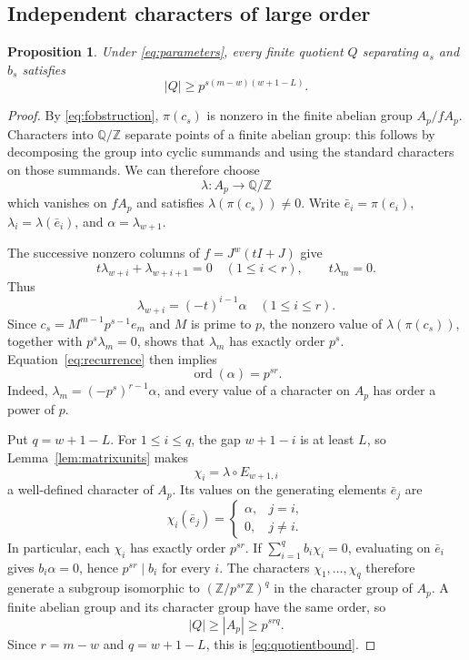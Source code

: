 \documentclass[11pt,letterpaper]{amsart}
\numberwithin{equation}{section}
\newtheorem{proposition}[theorem]{Proposition}
\theoremstyle{remark}
\newcommand{\Z}{\mathbb Z}
\newcommand{\Q}{\mathbb Q}
\newcommand{\ord}{\operatorname{ord}}
\begin{document}
\subsection{Independent characters of large order}

\begin{proposition}\label{prop:quotientbound}
Under \eqref{eq:parameters}, every finite quotient $Q$ separating
$a_s$ and $b_s$ satisfies
\begin{equation}\label{eq:quotientbound}
 |Q|\ge p^{s(m-w)(w+1-L)}.
\end{equation}
\end{proposition}

\begin{proof}
By \eqref{eq:fobstruction}, $\pi(c_s)$ is nonzero in the finite
abelian group $A_p/fA_p$. Characters into $\Q/\Z$ separate points
of a finite abelian group: this follows by decomposing the group into
cyclic summands and using the standard characters on those summands.
We can therefore choose
\[
 \lambda:A_p\longrightarrow\Q/\Z
\]
which vanishes on $fA_p$ and satisfies $\lambda(\pi(c_s))\ne0$.
Write $\bar e_i=\pi(e_i)$, $\lambda_i=\lambda(\bar e_i)$, and
$\alpha=\lambda_{w+1}$.

The successive nonzero columns of $f=J^w(tI+J)$ give
\[
 t\lambda_{w+i}+\lambda_{w+i+1}=0\quad(1\le i<r),
 \qquad t\lambda_m=0.
\]
Thus
\begin{equation}\label{eq:recurrence}
 \lambda_{w+i}=(-t)^{i-1}\alpha\quad(1\le i\le r).
\end{equation}
Since $c_s=M^{m-1}p^{s-1}e_m$ and $M$ is prime to $p$, the
nonzero value of $\lambda(\pi(c_s))$, together with
$p^s\lambda_m=0$, shows that $\lambda_m$ has exactly order $p^s$.
Equation~\eqref{eq:recurrence} then implies
\begin{equation}\label{eq:alphaorder}
 \ord(\alpha)=p^{sr}.
\end{equation}
Indeed, $\lambda_m=(-p^s)^{r-1}\alpha$, and every value of a
character on $A_p$ has order a power of $p$.

Put $q=w+1-L$. For $1\le i\le q$, the gap $w+1-i$ is at least
$L$, so Lemma~\ref{lem:matrixunits} makes
\[
 \chi_i=\lambda\circ E_{w+1,i}
\]
a well-defined character of $A_p$. Its values on the generating
elements $\bar e_j$ are
\[
 \chi_i(\bar e_j)=
 \begin{cases}\alpha,&j=i,\\0,&j\ne i.\end{cases}
\]
In particular, each $\chi_i$ has exactly order $p^{sr}$. If
$\sum_{i=1}^q b_i\chi_i=0$, evaluating on $\bar e_i$ gives
$b_i\alpha=0$, hence $p^{sr}\mid b_i$ for every $i$. The characters
$\chi_1,\ldots,\chi_q$ therefore generate a subgroup isomorphic to
$(\Z/p^{sr}\Z)^q$ in the character group of $A_p$. A finite
abelian group and its character group have the same order, so
\[
 |Q|\ge |A_p|\ge p^{srq}.
\]
Since $r=m-w$ and $q=w+1-L$, this is \eqref{eq:quotientbound}.
\end{proof}
\end{document}
